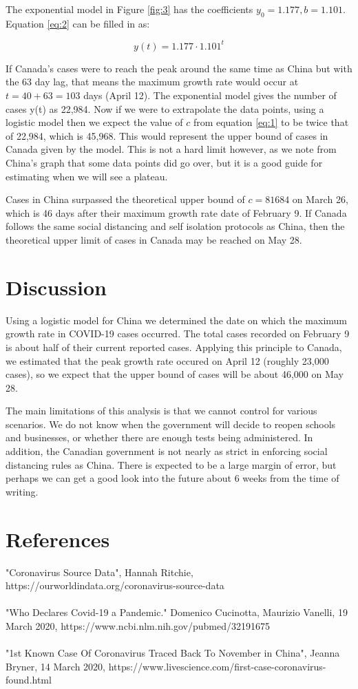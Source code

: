 \documentclass[12pt,a4paper]{article}
\begin{document}
The exponential model in Figure \ref{fig:3} has the coefficients $y_0 = 1.177, b = 1.101$. \newline Equation \ref{eq:2} can be filled in as:

\begin{equation}
y(t) = 1.177 \cdot 1.101^t
\end{equation} 

If Canada's cases were to reach the peak around the same time as China but with the 63 day lag, that means the maximum growth rate would occur at $t = 40+63 = 103$ days (April 12). The exponential model gives the number of cases y(t) as 22,984. Now if we were to extrapolate the data points, using a logistic model then we expect the value of $c$ from equation \ref{eq:1} to be twice that of 22,984, which is 45,968. This would represent the upper bound of cases in Canada given by the model. This is not a hard limit however, as we note from China's graph that some data points did go over, but it is a good guide for estimating when we will see a plateau.

Cases in China surpassed the theoretical upper bound of $c = 81684$ on March 26, which is 46 days after their maximum growth rate date of February 9. If Canada follows the same social distancing and self isolation protocols as China, then the theoretical upper limit of cases in Canada may be reached on May 28.

\section*{Discussion}
Using a logistic model for China we determined the date on which the maximum growth rate in COVID-19 cases occurred. The total cases recorded on February 9 is about half of their current reported cases. Applying this principle to Canada, we estimated that the peak growth rate occured on April 12 (roughly 23,000 cases), so we expect that the upper bound of cases will be about 46,000 on May 28.

The main limitations of this analysis is that we cannot control for various scenarios. We do not know when the government will decide to reopen schools and businesses, or whether there are enough tests being administered. In addition, the Canadian government is not nearly as strict in enforcing social distancing rules as China. There is expected to be a large margin of error, but perhaps we can get a good look into the future about 6 weeks from the time of writing. 

\section*{References}
"Coronavirus Source Data", Hannah Ritchie, \\ https://ourworldindata.org/coronavirus-source-data \\\\
"Who Declares Covid-19 a Pandemic." Domenico Cucinotta, Maurizio Vanelli, 19 March 2020, 
https://www.ncbi.nlm.nih.gov/pubmed/32191675 \\\\
"1st Known Case Of Coronavirus Traced Back To November in China", Jeanna Bryner, 14 March 2020, https://www.livescience.com/first-case-coronavirus-found.html
\end{document}
